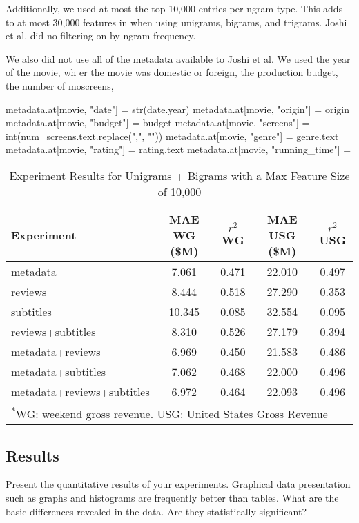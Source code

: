 \documentclass[11pt]{article}
\begin{document}
Additionally, we used at most
the top 10,000 entries per ngram type. This adds to at most 30,000 features in when using
unigrams, bigrams, and trigrams. Joshi et al. did no filtering on 
by ngram frequency. 

We also did not use all of the metadata available to Joshi et al. We used the year
of the movie, wh er the movie was domestic or foreign, the production budget,
the number of moscreens, 

       metadata.at[movie, "date"] = str(date.year)
        metadata.at[movie, "origin"] = origin
        metadata.at[movie, "budget"] = budget
        metadata.at[movie, "screens"] = int(num_screens.text.replace(",", ""))
        metadata.at[movie, "genre"] = genre.text
        metadata.at[movie, "rating"] = rating.text
        metadata.at[movie, "running_time"] =

 

\begin{table*}[t]
\caption{Experiment Results for Unigrams + Bigrams with a Max Feature Size of 10,000}
\centering
\begin{tabular}{|l c c c c|}
  \hline
  \textbf{Experiment} & \textbf{MAE WG (\$M)} & \textbf{$r^2$ WG} & \textbf{MAE USG (\$M)}
  & \textbf{$r^2$ USG}\\
  \hline
  metadata                    &  7.061 &  0.471  & 22.010  & 0.497\\
  reviews                     &  8.444 &  0.518  & 27.290  & 0.353\\
  subtitles                   & 10.345 &  0.085  & 32.554  & 0.095\\
  reviews+subtitles           &  8.310 &  0.526  & 27.179  & 0.394\\
  metadata+reviews            &  6.969 &  0.450  & 21.583  & 0.486\\
  metadata+subtitles          &  7.062 &  0.468  & 22.000  & 0.496\\
  metadata+reviews+subtitles  &  6.972 &  0.464  & 22.093  & 0.496\\
  \hline
  \multicolumn{5}{l}{\textsuperscript{*}\footnotesize{WG: weekend gross revenue. USG:
  United States Gross Revenue}}
\end{tabular}
\end{table*}

\subsection{Results}
Present the quantitative results of your experiments. Graphical data presentation such as
graphs and histograms are frequently better than tables. What are the basic differences
revealed in the data. Are they statistically significant?
\end{document}
